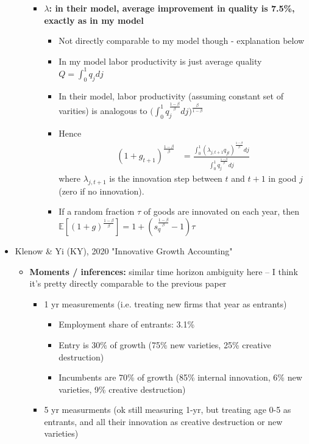 \documentclass[12pt,english]{article}
\theoremstyle{remark}
\begin{document}
\begin{itemize}
\begin{itemize}
\begin{itemize}
\begin{itemize}
			\end{itemize}
			\item \textbf{$\lambda$: in their model, average improvement in quality is 7.5\%, exactly as in my model}
			\begin{itemize}
				\item Not directly comparable to my model though - explanation below
				\item In my model labor productivity is just average quality $Q = \int_0^1 q_j dj$
				\item In their model, labor productivity (assuming constant set of varities) is analogous to $\Big(\int_0^1 q_j^{\frac{1-\beta}{\beta}}dj \Big)^{\frac{\beta}{1-\beta}}$
				\item Hence
				\begin{align*}
					(1+g_{t+1})^{\frac{1-\beta}{\beta}} &= \frac{\int_0^1 (\lambda_{j,t+1} q_{jt})^{\frac{1-\beta}{\beta}} dj}{\int_0^1q_j^{\frac{1-\beta}{\beta}} dj} 
				\end{align*}
				where $\lambda_{j,t+1}$ is the innovation step between $t$ and $t+1$ in good $j$ (zero if no innovation).
				\item If a random fraction $\tau$ of goods are innovated on each year, then $\mathbb{E}[(1+g)^{\frac{1-\beta}{\beta}}] = 1 + (s_q^{\frac{1-\beta}{\beta}} - 1) \tau$
			\end{itemize}
		\end{itemize}
	\end{itemize}
	\item Klenow \& Yi (KY), 2020 "Innovative Growth Accounting"
	\begin{itemize}
		\item \textbf{Moments / inferences:} similar time horizon ambiguity here -- I think it's pretty directly comparable to the previous paper
		\begin{itemize}
			\item 1 yr measurements (i.e. treating new firms that year as entrants)
			\begin{itemize}
				\item Employment share of entrants: 3.1\%
				\item Entry is 30\% of growth (75\% new varieties, 25\% creative destruction)
				\item Incumbents are 70\% of growth (85\% internal innovation, 6\% new varieties, 9\% creative destruction)
			\end{itemize}
			\item 5 yr measurments (ok still measuring 1-yr, but treating age 0-5 as entrants, and all their innovation as creative destruction or new varieties)

\end{itemize}
\end{itemize}
\end{itemize}
\end{document}

